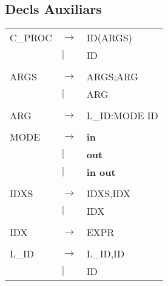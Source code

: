 \documentclass{article}
\begin{document}
	\subsection{Decls Auxiliars}
	\begin{tabular}{l l l}
		C\_PROC&$\to$&ID(ARGS)\\
		&$|$&ID\\
		\\
		ARGS&$\to$&ARGS;ARG\\
		&$|$&ARG\\
		\\
		ARG&$\to$&L\_ID:MODE ID\\
		\\
		MODE&$\to$&\textbf{in}\\
		&$|$&\textbf{out}\\
		&$|$&\textbf{in out}\\
		\\
		IDXS&$\to$&IDXS,IDX\\
		&$|$&IDX\\
		\\
		IDX&$\to$&EXPR\\
		\\
		L\_ID&$\to$&L\_ID,ID\\
		&$|$&ID
	\end{tabular}
\end{document}
